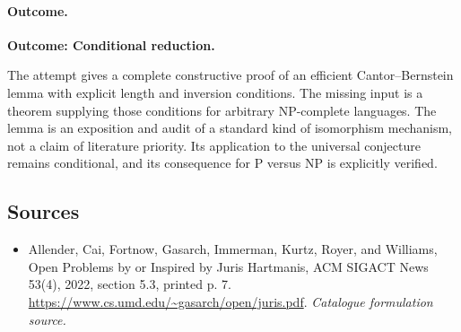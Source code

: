 \documentclass[11pt,a4paper]{article}
\numberwithin{equation}{section}
\begin{document}
\paragraph{Outcome.}
\textbf{Outcome: Conditional reduction.}

The attempt gives a complete constructive proof of an efficient
Cantor--Bernstein lemma with explicit length and inversion conditions.
The missing input is a theorem supplying those conditions for arbitrary
NP-complete languages. The lemma is an exposition and audit of a standard
kind of isomorphism mechanism, not a claim of literature priority. Its
application to the universal conjecture remains conditional, and its
consequence for $\mathrm P$ versus $\mathrm{NP}$ is explicitly verified.
\subsection{Sources}
\begin{itemize}\raggedright
\item[\textnormal{[S1]}]\hypertarget{source:30006769:1}{} Allender, Cai, Fortnow, Gasarch, Immerman, Kurtz, Royer, and Williams, Open Problems by or Inspired by Juris Hartmanis, ACM SIGACT News 53(4), 2022, section 5.3, printed p. 7.
\url{https://www.cs.umd.edu/~gasarch/open/juris.pdf}.
{\small\textit{Catalogue formulation source.}}
\end{itemize}
\end{document}
